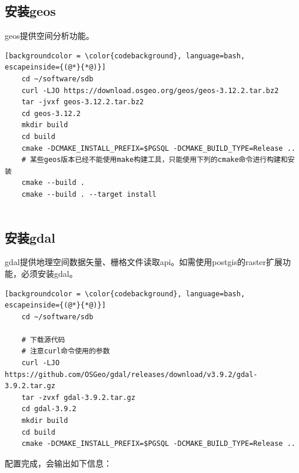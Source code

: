 \subsection{安装geos}
geos提供空间分析功能。
\begin{lstlisting}[backgroundcolor = \color{codebackground}, language=bash, escapeinside={(@*}{*@)}]
	cd ~/software/sdb
	curl -LJO https://download.osgeo.org/geos/geos-3.12.2.tar.bz2
	tar -jvxf geos-3.12.2.tar.bz2
	cd geos-3.12.2
	mkdir build
	cd build
	cmake -DCMAKE_INSTALL_PREFIX=$PGSQL -DCMAKE_BUILD_TYPE=Release ..
	# 某些geos版本已经不能使用make构建工具，只能使用下列的cmake命令进行构建和安装
	cmake --build . 
	cmake --build . --target install
	
\end{lstlisting}


\subsection{安装gdal}
gdal提供地理空间数据矢量、栅格文件读取api。如需使用postgis的raster扩展功能，必须安装gdal。
\begin{lstlisting}[backgroundcolor = \color{codebackground}, language=bash, escapeinside={(@*}{*@)}]
	cd ~/software/sdb
	
	# 下载源代码
	# 注意curl命令使用的参数
	curl -LJO https://github.com/OSGeo/gdal/releases/download/v3.9.2/gdal-3.9.2.tar.gz
	tar -zvxf gdal-3.9.2.tar.gz
	cd gdal-3.9.2
	mkdir build
	cd build
	cmake -DCMAKE_INSTALL_PREFIX=$PGSQL -DCMAKE_BUILD_TYPE=Release ..
\end{lstlisting}

配置完成，会输出如下信息：

